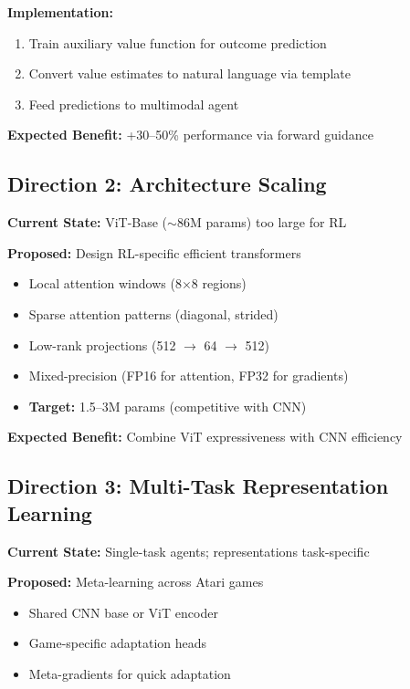 \documentclass[12pt,a4paper,openany]{report}
\begin{document}
\textbf{Implementation:}
\begin{enumerate}
    \item Train auxiliary value function for outcome prediction
    \item Convert value estimates to natural language via template
    \item Feed predictions to multimodal agent
\end{enumerate}

\textbf{Expected Benefit:} +30--50\% performance via forward guidance

\subsection{Direction 2: Architecture Scaling}

\textbf{Current State:} ViT-Base ($\sim 86\text{M}$ params) too large for RL

\textbf{Proposed:} Design RL-specific efficient transformers

\begin{itemize}
    \item Local attention windows (8$\times$8 regions)
    \item Sparse attention patterns (diagonal, strided)
    \item Low-rank projections (512 $\to$ 64 $\to$ 512)
    \item Mixed-precision (FP16 for attention, FP32 for gradients)
    \item \textbf{Target:} 1.5--3M params (competitive with CNN)
\end{itemize}

\textbf{Expected Benefit:} Combine ViT expressiveness with CNN efficiency

\subsection{Direction 3: Multi-Task Representation Learning}

\textbf{Current State:} Single-task agents; representations task-specific

\textbf{Proposed:} Meta-learning across Atari games

\begin{itemize}
    \item Shared CNN base or ViT encoder
    \item Game-specific adaptation heads
    \item Meta-gradients for quick adaptation
\end{itemize}
\end{document}
